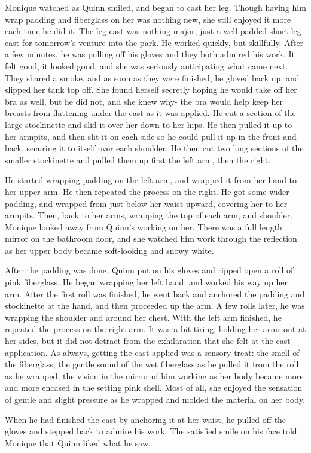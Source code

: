 \begin{thought}
Monique watched as Quinn smiled, and began to cast her leg. Though having him wrap padding
and fiberglass on her was nothing new, she still enjoyed it more each time he did it. The leg
cast was nothing major, just a well padded short leg cast for tomorrow's venture into the park.
He worked quickly, but skillfully. After a few minutes, he was pulling off his gloves and they
both admired his work. It felt good, it looked good, and she was seriously anticipating what
came next. They shared a smoke, and as soon as they were finished, he gloved back up, and
slipped her tank top off. She found herself secretly hoping he would take off her bra as well,
but he did not, and she knew why- the bra would help keep her breasts from flattening under the
cast as it was applied. He cut a section of the large stockinette and slid it over her down to
her hips. He then pulled it up to her armpits, and then slit it on each side so he could pull it
up in the front and back, securing it to itself over each shoulder. He then cut two long
sections of the smaller stockinette and pulled them up first the left arm, then the right.

He started wrapping padding on the left arm, and wrapped it from her hand to her upper arm.
He then repeated the process on the right. He got some wider padding, and wrapped from just
below her waist upward, covering her to her armpits. Then, back to her arms, wrapping the top of
each arm, and shoulder. Monique looked away from Quinn's working on her. There was a full length
mirror on the bathroom door, and she watched him work through the reflection as her upper body
became soft-looking and snowy white.

After the padding was done, Quinn put on his gloves and ripped open a roll of pink
fiberglass. He began wrapping her left hand, and worked his way up her arm. After the first roll
was finished, he went back and anchored the padding and stockinette at the hand, and then
proceeded up the arm. A few rolls later, he was wrapping the shoulder and around her chest. With
the left arm finished, he repeated the process on the right arm. It was a bit tiring, holding
her arms out at her sides, but it did not detract from the exhilaration that she felt at the
cast application. As always, getting the cast applied was a sensory treat: the smell of the
fiberglass; the gentle sound of the wet fiberglass as he pulled it from the roll as he wrapped;
the vision in the mirror of him working as her body became more and more encased in the setting
pink shell. Most of all, she enjoyed the sensation of gentle and slight pressure as he wrapped
and molded the material on her body.

When he had finished the cast by anchoring it at her waist, he pulled off the gloves and
stepped back to admire his work. The satisfied smile on his face told Monique that Quinn liked
what he saw.
\end{thought}

